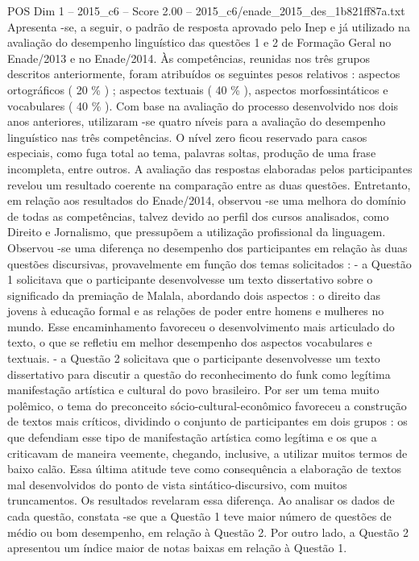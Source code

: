 \begin{textsample}{POS Dim 1 – 2015\_c6 – Score 2.00 – 2015\_c6/enade\_2015\_des\_1b821ff87a.txt}
Apresenta -se, a seguir, o padrão de resposta aprovado pelo Inep e já utilizado na avaliação do desempenho linguístico das questões 1 e 2 de Formação Geral no Enade/2013 e no Enade/2014.
Às competências, reunidas nos três grupos descritos anteriormente, foram atribuídos os seguintes pesos relativos : aspectos ortográficos ( 20 \% ) ; aspectos textuais ( 40 \% ), aspectos morfossintáticos e vocabulares ( 40 \% ).
Com base na avaliação do processo desenvolvido nos dois anos anteriores, utilizaram -se quatro níveis para a avaliação do desempenho linguístico nas três competências.
O nível zero ficou reservado para casos especiais, como fuga total ao tema, palavras soltas, produção de uma frase incompleta, entre outros.
A avaliação das respostas elaboradas pelos participantes revelou um resultado coerente na comparação entre as duas questões.
Entretanto, em relação aos resultados do Enade/2014, observou -se uma melhora do domínio de todas as competências, talvez devido ao perfil dos cursos analisados, como Direito e Jornalismo, que pressupõem a utilização profissional da linguagem.
Observou -se uma diferença no desempenho dos participantes em relação às duas questões discursivas, provavelmente em função dos temas solicitados : - a Questão 1 solicitava que o participante desenvolvesse um texto dissertativo sobre o significado da premiação de Malala, abordando dois aspectos : o direito das jovens à educação formal e as relações de poder entre homens e mulheres no mundo.
Esse encaminhamento favoreceu o desenvolvimento mais articulado do texto, o que se refletiu em melhor desempenho dos aspectos vocabulares e textuais. - a Questão 2 solicitava que o participante desenvolvesse um texto dissertativo para discutir a questão do reconhecimento do funk como legítima manifestação artística e cultural do povo brasileiro.
Por ser um tema muito polêmico, o tema do preconceito sócio-cultural-econômico favoreceu a construção de textos mais críticos, dividindo o conjunto de participantes em dois grupos : os que defendiam esse tipo de manifestação artística como legítima e os que a criticavam de maneira veemente, chegando, inclusive, a utilizar muitos termos de baixo calão.
Essa última atitude teve como consequência a elaboração de textos mal desenvolvidos do ponto de vista sintático-discursivo, com muitos truncamentos.
Os resultados revelaram essa diferença.
Ao analisar os dados de cada questão, constata -se que a Questão 1 teve maior número de questões de médio ou bom desempenho, em relação à Questão 2.
Por outro lado, a Questão 2 apresentou um índice maior de notas baixas em relação à Questão 1.

\end{textsample}
